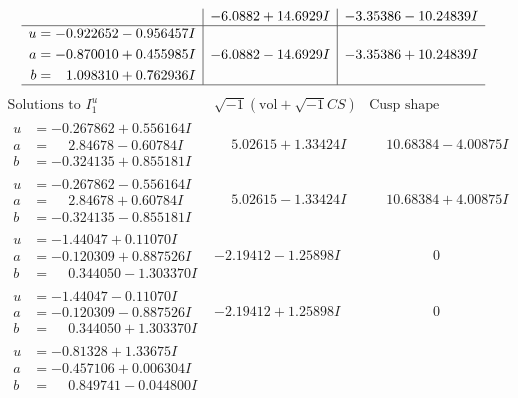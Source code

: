\documentclass[1p]{elsarticle_modified}
\theoremstyle{definition}
\newcommand{\I}{\sqrt{-1}}
\begin{document}
$$\begin{array}{c|c|c}
 & -6.0882 + 14.6929 I & -3.35386 - 10.24839 I \\ \hline\begin{aligned}
u &= -0.922652 - 0.956457 I \\
a &= -0.870010 + 0.455985 I \\
b &= \phantom{-}1.098310 + 0.762936 I\end{aligned}
 & -6.0882 - 14.6929 I & -3.35386 + 10.24839 I\\
 \hline 
 \end{array}$$\newpage$$\begin{array}{c|c|c}  
\text{Solutions to }I^u_{1}& \I (\text{vol} + \sqrt{-1}CS) & \text{Cusp shape}\\
 \hline 
\begin{aligned}
u &= -0.267862 + 0.556164 I \\
a &= \phantom{-}2.84678 - 0.60784 I \\
b &= -0.324135 + 0.855181 I\end{aligned}
 & \phantom{-}5.02615 + 1.33424 I & \phantom{-}10.68384 - 4.00875 I \\ \hline\begin{aligned}
u &= -0.267862 - 0.556164 I \\
a &= \phantom{-}2.84678 + 0.60784 I \\
b &= -0.324135 - 0.855181 I\end{aligned}
 & \phantom{-}5.02615 - 1.33424 I & \phantom{-}10.68384 + 4.00875 I \\ \hline\begin{aligned}
u &= -1.44047 + 0.11070 I \\
a &= -0.120309 + 0.887526 I \\
b &= \phantom{-}0.344050 - 1.303370 I\end{aligned}
 & -2.19412 - 1.25898 I & \phantom{-0.000000 } 0 \\ \hline\begin{aligned}
u &= -1.44047 - 0.11070 I \\
a &= -0.120309 - 0.887526 I \\
b &= \phantom{-}0.344050 + 1.303370 I\end{aligned}
 & -2.19412 + 1.25898 I & \phantom{-0.000000 } 0 \\ \hline\begin{aligned}
u &= -0.81328 + 1.33675 I \\
a &= -0.457106 + 0.006304 I \\
b &= \phantom{-}0.849741 - 0.044800 I\end{aligned}

\end{array}$$
\end{document}
